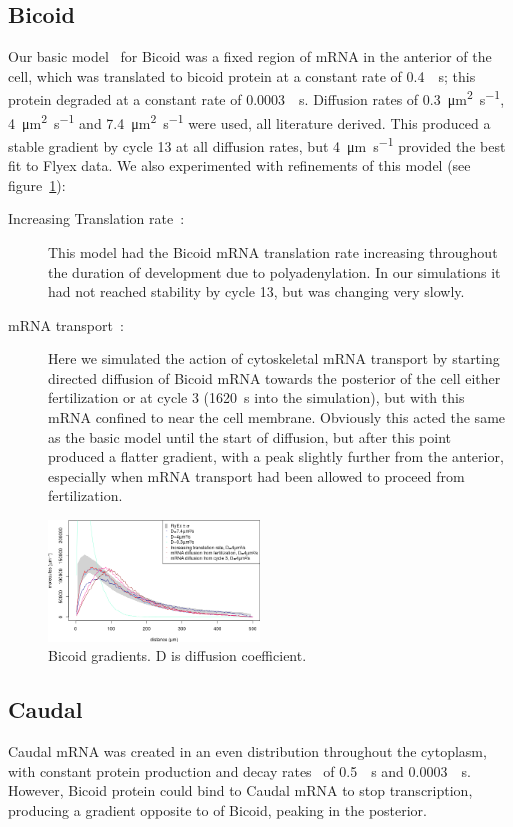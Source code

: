\documentclass[11pt,a4paper,twocolumn]{article}
\begin{document}
\subsection{Bicoid}
Our basic model~\cite{Grimm2010} for Bicoid was a fixed region of mRNA in the anterior of the cell, which was translated to bicoid protein at a constant rate of \SI{0.4}{\per\second}; this protein degraded at a constant rate of \SI{0.0003}{\per\second}. Diffusion rates of \SI{0.3}{\micro\metre\squared\per\second}, \SI{4}{\micro\metre\squared\per\second} and \SI{7.4}{\micro\metre\squared\per\second} were used, all literature derived. This produced a stable gradient by cycle 13 at all diffusion rates, but  \SI{4}{\micro\metre\per\second} provided the best fit to Flyex data.  We also experimented with refinements of this model (see figure~\ref{fig:bcd-grads}):
\begin{description}
\item[Increasing Translation rate~\cite{Holloway2011}:]
This model had the Bicoid mRNA translation rate increasing throughout the duration of development due to polyadenylation. In our simulations it had not reached stability by cycle 13, but was changing very slowly.
\item[mRNA transport~\cite{Spirov2009}:]
Here we simulated the action of cytoskeletal mRNA transport by starting directed diffusion of Bicoid mRNA towards the posterior of the cell either fertilization or at cycle 3 (\SI{1620}{\second} into the simulation), but with this mRNA confined to near the cell membrane. Obviously this acted the same as the basic model until the start of diffusion, but after this point produced a flatter gradient, with a peak slightly further from the anterior, especially when mRNA transport had been allowed to proceed from fertilization.
\end{description}
\begin{figure}[h]
\includegraphics[width=0.5\textwidth]{writeup-bcd-diffusion}
\caption{Bicoid gradients. D is diffusion coefficient. \label{fig:bcd-grads}}
\end{figure}
\subsection{Caudal}
Caudal mRNA was created in an even distribution throughout the cytoplasm, with constant protein production and decay rates~\cite{Bergmann2007} of \SI{0.5}{\per\second} and \SI{0.0003}{\per\second}. However, Bicoid protein could bind to Caudal mRNA to stop transcription, producing a gradient opposite to of Bicoid, peaking in the posterior.
\end{document}
